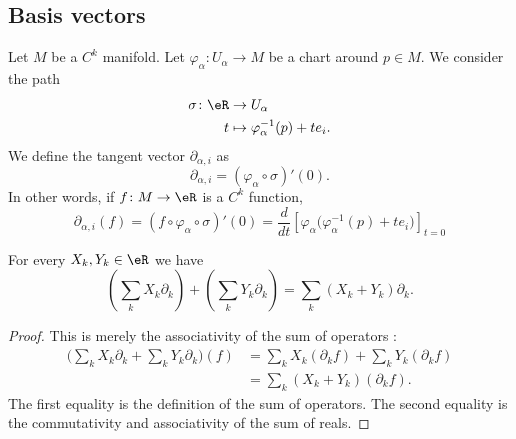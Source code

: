 \subsection{Basis vectors}

\begin{definition}		\label{DEFooUWWWooXhHVXP}
	Let \( M\) be a \( C^k\) manifold. Let \(\varphi_{\alpha}\colon U_{\alpha} \to M  \) be a chart around \( p\in M\). We consider the path
	\begin{equation}
		\begin{aligned}
			\sigma\colon \eR & \to U_{\alpha}                         \\
			t                & \mapsto \varphi_{\alpha}^{-1}(p)+te_i.
		\end{aligned}
	\end{equation}
	We define the tangent vector \( \partial_{\alpha,i}\) as
	\begin{equation}		\label{EQooHBUBooSuKyLm}
		\partial_{\alpha,i}=(\varphi_{\alpha}\circ\sigma)'(0).
	\end{equation}
	In other words, if \(f \colon M\to \eR  \) is a \( C^k\) function,
	\begin{equation}
		\partial_{\alpha,i}(f)=(f\circ\varphi_{\alpha}\circ \sigma)'(0)=\frac{d}{dt} \left[ \varphi_{\alpha}\Big( \varphi_{\alpha}^{-1}(p)+te_i \Big)  \right]_{t=0}
	\end{equation}
\end{definition}

\begin{proposition}		\label{PROPooCGKRooLjlULU}
	For every \( X_k,Y_k\in \eR\) we have
	\begin{equation}
		\left( \sum_kX_k\partial_k \right)+\left( \sum_kY_k\partial_k \right)=\sum_k (X_k+Y_k)\partial_k.
	\end{equation}
\end{proposition}

\begin{proof}
	This is merely the associativity of the sum of operators :
	\begin{subequations}
		\begin{align}
			\Big( \sum_kX_k\partial_k+\sum_kY_k\partial_k \Big)(f) & =\sum_kX_k(\partial_kf)+\sum_kY_k(\partial_kf) \\
			                                                       & =\sum_k(X_k+Y_k)(\partial_kf).
		\end{align}
	\end{subequations}
	The first equality is the definition of the sum of operators. The second equality is the commutativity and associativity of the sum of reals.
\end{proof}


